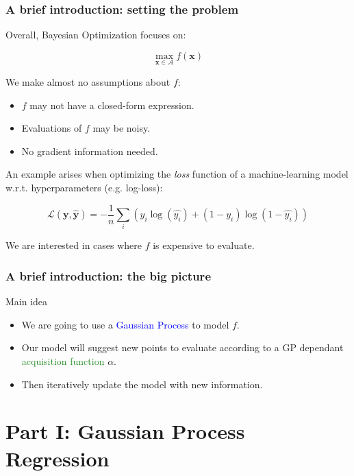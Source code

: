 \documentclass[10pt,usenames,dvipsnames]{beamer}
\begin{document}
	\begin{frame}
		\frametitle{A brief introduction: setting the problem}
		Overall, Bayesian Optimization focuses on:
		
		\begin{equation}
			\max_{\boldsymbol{x}\in \mathcal{A}} f(\boldsymbol{x})
		\end{equation}
		
		We make almost no assumptions about $f$:
		\begin{itemize}
			\item $f$ may not have a closed-form expression.
			\item Evaluations of $f$ may be noisy.
			\item No gradient information needed.
		\end{itemize}
		
		An example arises when optimizing the \textit{loss} function of a machine-learning model w.r.t. hyperparameters (e.g. log-loss):
		
		\begin{equation}
		\mathcal{L}(\boldsymbol{y}, \boldsymbol{\hat{y}}) = -\dfrac{1}{n} \sum_i \left(y_i \log(\hat{y_i}) + (1 - y_i)\log(1-\hat{y_i})\right)
		\end{equation}
		
		We are interested in cases where $f$ is \textcolor{BrickRed}{expensive} to evaluate.
	\end{frame}
	
	\begin{frame}
		\frametitle{A brief introduction: the big picture}
		\begin{block}{Main idea}
		\begin{itemize}
		\item We are going to use a \textcolor{blue}{Gaussian Process} to model $f$.
		\item Our model will suggest new points to evaluate according to a GP dependant \textcolor{ForestGreen}{acquisition function} $\alpha$.
		\item Then iteratively update the model with new information.
		\end{itemize}
		\end{block}
	\end{frame}
	
	\section{Part I: Gaussian Process Regression}
	
\end{document}
